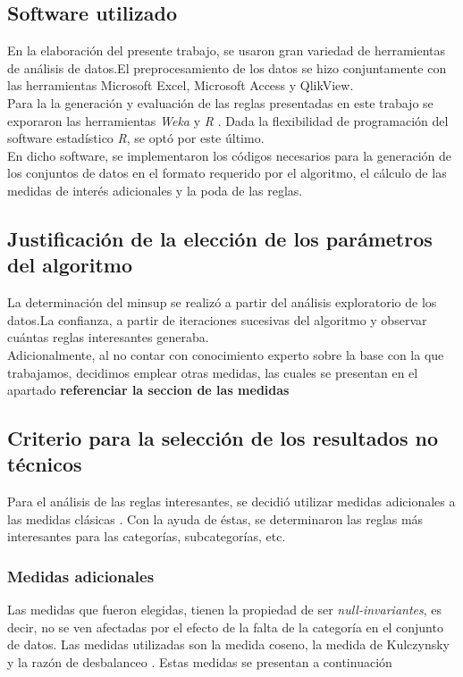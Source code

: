 \documentclass[]{article}
\begin{document}
\subsection{Software utilizado}
En la elaboración del presente trabajo, se usaron gran variedad de herramientas de análisis de datos.El preprocesamiento de los datos se hizo conjuntamente con las herramientas Microsoft Excel, Microsoft Access y QlikView.\\

Para la la generación y evaluación de las reglas presentadas en este trabajo se exporaron las herramientas \textit{Weka} \cite{Weka1} y \textit{R} \cite{RCran}. Dada la flexibilidad de programación del software estadístico \textit{R}, se optó por este último.\\
 
En dicho software, se implementaron los códigos necesarios para la generación de los conjuntos de datos en el formato requerido por el algoritmo, el cálculo de las medidas de interés adicionales y la poda de las reglas.

\subsection{Justificación de la elección de los parámetros del algoritmo}
La determinación del minsup se realizó a partir del análisis exploratorio de los datos.La confianza, a partir de iteraciones sucesivas del algoritmo y observar cuántas reglas interesantes generaba.\\

Adicionalmente, al no contar con conocimiento experto sobre la base con la que trabajamos, decidimos emplear otras medidas, las cuales se presentan en el apartado \huge{\textbf{referenciar la seccion de las medidas}} 
\normalsize
\subsection{Criterio para la selección de los resultados no técnicos}

Para el análisis de las reglas interesantes, se decidió utilizar medidas adicionales a las medidas clásicas \cite{Tan:2005:IDM:1095618}. Con la ayuda de éstas, se determinaron las reglas más interesantes para las categorías, subcategorías, etc. 

\subsubsection{Medidas adicionales}
Las medidas que fueron elegidas, tienen la propiedad de ser \textit{null-invariantes}, es decir, no se ven afectadas por el efecto de la falta de la categoría en el conjunto de datos. Las medidas utilizadas son la medida coseno, la medida de Kulczynsky y la razón de desbalanceo \cite{Hall:2009:WDM:1656274.1656278}. Estas medidas se presentan a continuación\\
\end{document}
